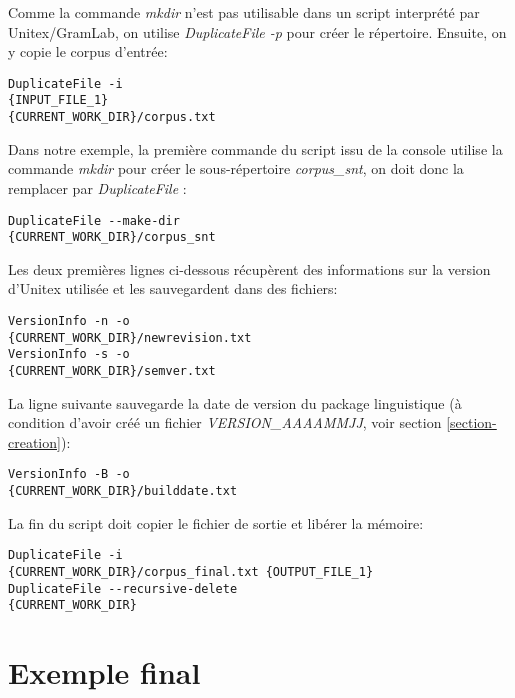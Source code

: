 \bigskip
\noindent Comme la commande \emph{mkdir} n’est pas utilisable dans un script interprété par Unitex/GramLab, on utilise \emph{DuplicateFile -p} pour créer le répertoire. Ensuite, on y copie le corpus d’entrée:

\begin{verbatim}
DuplicateFile -i 
{INPUT_FILE_1} 
{CURRENT_WORK_DIR}/corpus.txt
\end{verbatim}

\bigskip
\noindent Dans notre exemple, la première commande du script issu de la console utilise la commande \emph{mkdir} pour créer le sous-répertoire \emph{corpus\_snt}, on doit donc la remplacer par \emph{DuplicateFile} :

\begin{verbatim}
DuplicateFile --make-dir 
{CURRENT_WORK_DIR}/corpus_snt
\end{verbatim}

\bigskip
\noindent Les deux premières lignes ci-dessous récupèrent des informations sur la version d'Unitex utilisée et les sauvegardent dans des fichiers:

\begin{verbatim}
VersionInfo -n -o 
{CURRENT_WORK_DIR}/newrevision.txt
VersionInfo -s -o 
{CURRENT_WORK_DIR}/semver.txt
\end{verbatim}

\bigskip
\noindent La ligne suivante sauvegarde la date de version du package linguistique (à condition d'avoir créé un fichier \emph{VERSION\_AAAAMMJJ}, voir section \ref{section-creation}):

\begin{verbatim}
VersionInfo -B -o 
{CURRENT_WORK_DIR}/builddate.txt
\end{verbatim}

\bigskip
\noindent La fin du script doit copier le fichier de sortie et libérer la mémoire:

\begin{verbatim}
DuplicateFile -i 
{CURRENT_WORK_DIR}/corpus_final.txt {OUTPUT_FILE_1}
DuplicateFile --recursive-delete 
{CURRENT_WORK_DIR}
\end{verbatim}

\section{Exemple final}

